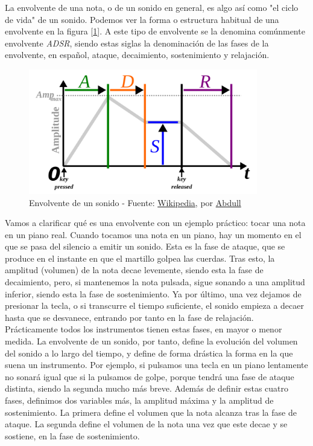 La envolvente de una nota, o de un sonido en general, es algo así como "el ciclo de vida" de un sonido. Podemos ver la forma o estructura habitual de una envolvente en la figura [\ref{fig:ADSR}]. A este tipo de envolvente se la denomina comúnmente envolvente \emph{ADSR}, siendo estas siglas la denominación de las fases de la envolvente, en español, ataque, decaimiento, sostenimiento y relajación.\\

\begin{figure}[h]
	\centering
	\includegraphics[width=10cm]{archivos/ADSR}
	\caption{Envolvente de un sonido - Fuente: \href{https://en.wikipedia.org/wiki/Envelope_(music)\#/media/File:ADSR_parameter.svg}{Wikipedia}, por \href{https://commons.wikimedia.org/wiki/User:Abdull}{Abdull}}
	\label{fig:ADSR}
\end{figure}

Vamos a clarificar qué es una envolvente con un ejemplo práctico: tocar una nota en un piano real. Cuando tocamos una nota en un piano, hay un momento en el que se pasa del silencio a emitir un sonido. Esta es la fase de ataque, que se produce en el instante en que el martillo golpea las cuerdas. Tras esto, la amplitud (volumen) de la nota decae levemente, siendo esta la fase de decaimiento, pero, si mantenemos la nota pulsada, sigue sonando a una amplitud inferior, siendo esta la fase de sostenimiento. Ya por último, una vez dejamos de presionar la tecla, o si transcurre el tiempo suficiente, el sonido empieza a decaer hasta que se desvanece, entrando por tanto en la fase de relajación. Prácticamente todos los instrumentos tienen estas fases, en mayor o menor medida. La envolvente de un sonido, por tanto, define la evolución del volumen del sonido a lo largo del tiempo, y define de forma drástica la forma en la que suena un instrumento. Por ejemplo, si pulsamos una tecla en un piano lentamente no sonará igual que si la pulsamos de golpe, porque tendrá una fase de ataque distinta, siendo la segunda mucho más breve. Además de definir estas cuatro fases, definimos dos variables más, la amplitud máxima y la amplitud de sostenimiento. La primera define el volumen que la nota alcanza tras la fase de ataque. La segunda define el volumen de la nota una vez que este decae y se sostiene, en la fase de sostenimiento.\\

